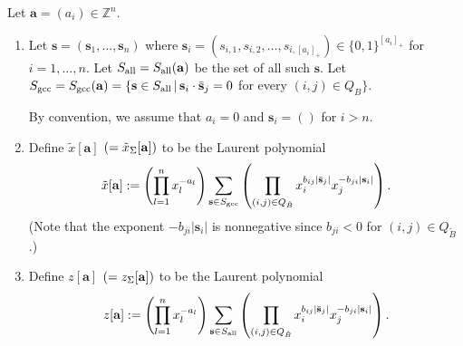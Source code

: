\documentclass[pdftex]{sigma}
\numberwithin{equation}{section}
\begin{document}
\begin{Definition}\label{definition:GCC2}
Let $\mathbf{a}=(a_i)\in \mathbb{Z}^n$.
\begin{enumerate}\itemsep=0pt
\item[(i)] Let $\mathbf{s}=(\mathbf{s}_1,\dots,\mathbf{s}_n)$ where
$\mathbf{s}_i=(s_{i,1},s_{i,2},\dots,s_{i,[a_i]_+})\in\{0,1\}^{[a_i]_+}$ for $i=1,\dots,n$. Let $S_{\rm all}=S_{\rm all}({\bf a})$ be the set of all such $\mathbf{s}$. Let $S_{\rm gcc}=S_{\rm gcc}({\bf a})=\{\mathbf{s}\in S_{\rm all}\, |\, \mathbf{s}_i\cdot\bar{\mathbf{s}}_j=0$ for every $(i,j)\in Q_B\}$.

By convention, we assume that $a_i=0$ and $\mathbf{s}_i=()$ for $i>n$.

\item[(ii)] Def\/ine $\tilde{x}[\mathbf{a}]$ $(=\tilde{x}_\Sigma[{\bf a}])$ to be the Laurent polynomial
\begin{gather*}
\tilde{x}[\mathbf{a}]:=\left(\prod_{l=1}^n  x_l^{-a_l}\right)
\sum_{\mathbf{s}\in S_{\rm gcc}}\left(\prod_{(i,j)\in Q_{\tilde B}}  x_{i}^{b_{ij}| \bar{\mathbf{s}}_j |} x_{j}^{-b_{ji}|\mathbf{s}_i|}\right).
\end{gather*}
(Note that the exponent $-b_{ji}|\mathbf{s}_i|$ is nonnegative since $b_{ji}<0$ for $(i,j)\in Q_{\tilde B}$.)

\item[(iii)] Def\/ine $z[\mathbf{a}]$ $(=z_\Sigma[{\bf a}])$ to be the Laurent polynomial
\begin{gather*}
z[\mathbf{a}]:=\left(\prod_{l=1}^n  x_l^{-a_l}\right)
\sum_{\mathbf{s}\in S_{\rm all}}\left(\prod_{(i,j)\in Q_{\tilde B}}  x_{i}^{b_{ij}|\bar{\mathbf{s}}_j|} x_{j}^{-b_{ji}|\mathbf{s}_i|}\right).
\end{gather*}
\end{enumerate}
\end{Definition}
\end{document}
